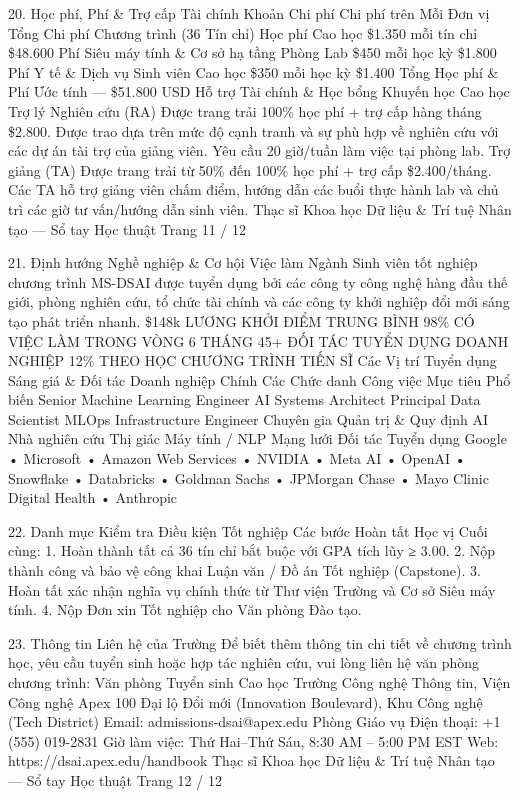 \documentclass[12pt]{article}
\begin{document}
20. Học phí, Phí \& Trợ cấp Tài chính
Khoản Chi phí
Chi phí trên Mỗi Đơn vị
Tổng Chi phí Chương trình (36 Tín chỉ)
Học phí Cao học
\$1.350 mỗi tín chỉ
\$48.600
Phí Siêu máy tính \& Cơ sở hạ tầng Phòng Lab
\$450 mỗi học kỳ
\$1.800
Phí Y tế \& Dịch vụ Sinh viên Cao học
\$350 mỗi học kỳ
\$1.400
Tổng Học phí \& Phí Ước tính
—
\$51.800 USD
Hỗ trợ Tài chính \& Học bổng Khuyến học Cao học
Trợ lý Nghiên cứu (RA)
Được trang trải 100\% học phí + trợ cấp hàng tháng \$2.800.
Được trao dựa trên mức độ cạnh tranh và sự phù hợp về nghiên cứu với
các dự án tài trợ của giảng viên. Yêu cầu 20 giờ/tuần làm việc tại phòng lab.
Trợ giảng (TA)
Được trang trải từ 50\% đến 100\% học phí + trợ cấp \$2.400/tháng.
Các TA hỗ trợ giảng viên chấm điểm, hướng dẫn các buổi thực hành
lab và chủ trì các giờ tư vấn/hướng dẫn sinh viên.
Thạc sĩ Khoa học Dữ liệu \& Trí tuệ Nhân tạo — Sổ tay Học thuật
Trang 11 / 12

21. Định hướng Nghề nghiệp \& Cơ hội Việc làm Ngành
Sinh viên tốt nghiệp chương trình MS-DSAI được tuyển dụng bởi các công ty công nghệ hàng đầu thế giới, phòng nghiên cứu, tổ chức tài chính và các công ty khởi nghiệp đổi mới sáng tạo phát triển nhanh.
\$148k
LƯƠNG KHỞI ĐIỂM TRUNG BÌNH
98\%
CÓ VIỆC LÀM TRONG VÒNG 6 THÁNG
45+
ĐỐI TÁC TUYỂN DỤNG DOANH NGHIỆP
12\%
THEO HỌC CHƯƠNG TRÌNH TIẾN SĨ
Các Vị trí Tuyển dụng Sáng giá \& Đối tác Doanh nghiệp Chính
Các Chức danh Công việc Mục tiêu Phổ biến
Senior Machine Learning Engineer
AI Systems Architect
Principal Data Scientist
MLOps Infrastructure Engineer
Chuyên gia Quản trị \& Quy định AI
Nhà nghiên cứu Thị giác Máy tính / NLP
Mạng lưới Đối tác Tuyển dụng
Google • Microsoft • Amazon Web Services • NVIDIA • Meta AI
• OpenAI • Snowflake • Databricks • Goldman Sachs •
JPMorgan Chase • Mayo Clinic Digital Health • Anthropic

22. Danh mục Kiểm tra Điều kiện Tốt nghiệp
Các bước Hoàn tất Học vị Cuối cùng:
1. Hoàn thành tất cả 36 tín chỉ bắt buộc với GPA tích lũy ≥ 3.00.
2. Nộp thành công và bảo vệ công khai Luận văn / Đồ án Tốt nghiệp (Capstone).
3. Hoàn tất xác nhận nghĩa vụ chính thức từ Thư viện Trường và Cơ sở Siêu máy tính.
4. Nộp Đơn xin Tốt nghiệp cho Văn phòng Đào tạo.

23. Thông tin Liên hệ của Trường
Để biết thêm thông tin chi tiết về chương trình học, yêu cầu tuyển sinh hoặc hợp tác nghiên cứu, vui lòng liên hệ văn phòng chương trình:
Văn phòng Tuyển sinh Cao học
Trường Công nghệ Thông tin, Viện Công nghệ Apex
100 Đại lộ Đổi mới (Innovation Boulevard), Khu Công nghệ (Tech District)
Email: admissions-dsai@apex.edu
Phòng Giáo vụ
Điện thoại: +1 (555) 019-2831
Giờ làm việc: Thứ Hai–Thứ Sáu, 8:30 AM – 5:00 PM EST
Web: https://dsai.apex.edu/handbook
Thạc sĩ Khoa học Dữ liệu \& Trí tuệ Nhân tạo — Sổ tay Học thuật
Trang 12 / 12
\end{document}
